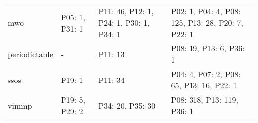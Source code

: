 \begin{tabular}{m{4cm}m{3cm}m{3cm}m{5cm}}
                    mwo &          P05: 1, P31: 1 &                  P11: 46, P12: 1, P24: 1, P30: 1, P34: 1 &          P02: 1, P04: 4, P08: 125, P13: 28, P20: 7, P22: 1 \\
          periodictable &                       - &                                                  P11: 13 &                                    P08: 19, P13: 6, P36: 1 \\
                   ssos &                  P19: 1 &                                                  P11: 34 &                   P04: 4, P07: 2, P08: 65, P13: 16, P22: 1 \\
                  vimmp &          P19: 5, P29: 2 &                                         P34: 20, P35: 30 &                                 P08: 318, P13: 119, P36: 1 \\
\bottomrule
\end{tabular}
